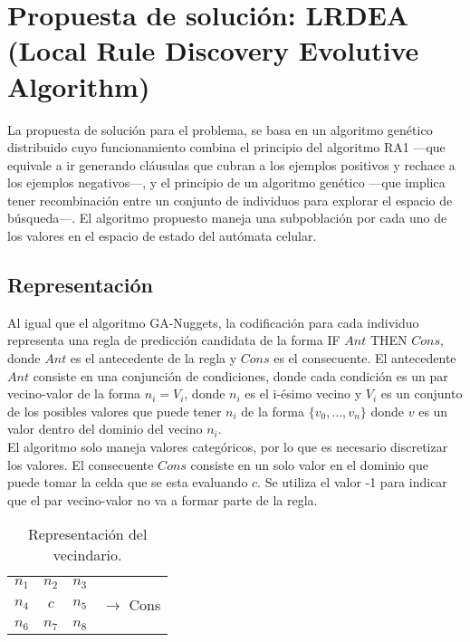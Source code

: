 \chapter{Propuesta de solución: LRDEA (Local Rule Discovery Evolutive Algorithm)}
\label{LRDEA}

La propuesta de solución para el problema, se basa en un algoritmo genético distribuido cuyo funcionamiento combina el principio del algoritmo RA1 ---que equivale a ir generando cláusulas que cubran a los ejemplos positivos y rechace a los ejemplos negativos---, y el principio de un algoritmo genético ---que implica tener recombinación entre un conjunto de individuos para explorar el espacio de búsqueda---.  El algoritmo propuesto maneja una subpoblación por cada uno de los valores en el espacio de estado del autómata celular.

\section{Representación}

Al igual que el algoritmo GA-Nuggets, la codificación para cada individuo representa una regla de predicción candidata de la forma IF $Ant$ THEN $Cons$, donde $Ant$ es el antecedente de la regla y $Cons$ es el consecuente. El antecedente $Ant$ consiste en una conjunción de condiciones, donde cada condición es un par vecino-valor de la forma $n_i = V_i$, donde $n_i$ es el i-ésimo vecino y $V_{i}$ es un conjunto de los posibles valores que puede tener $n_i$ de la forma $\{v_{0},\dots,v_{n}\}$ donde $v$ es un valor dentro del dominio del vecino $n_i$.
\\

El algoritmo solo maneja valores categóricos, por lo que es necesario discretizar los valores. El consecuente $Cons$ consiste en un solo valor en el dominio que puede tomar la celda que se esta evaluando $c$. Se utiliza el valor -1 para indicar que el par vecino-valor no va a formar parte de la regla.


\begin{table}[H]
	\begin{center}
		\begin{tabular}{ c c c c}
			$n_1$&$n_2$&$n_3$&\\
			$n_4$&$c$&$n_5$& $\rightarrow$ Cons\\
			$n_6$&$n_7$&$n_8$&\\
		\end{tabular}
	\end{center}
	\caption{\label{tab:lrdeaneigh} Representación del vecindario.}
\end{table}

